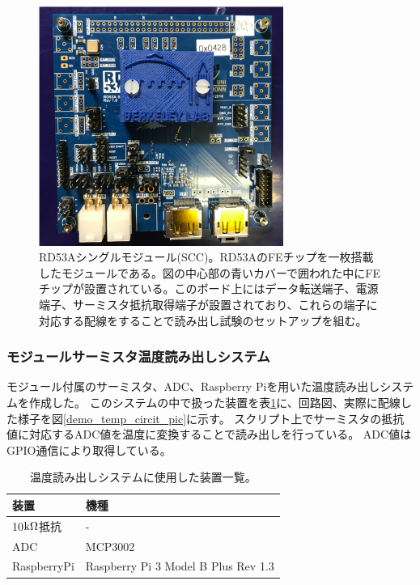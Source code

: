 \begin{figure}[h]\centering
\includegraphics[width=8cm]{rd53a_SCC}
\caption[RD53Aシングルモジュール(SCC)]{RD53Aシングルモジュール(SCC)\cite{5-10}。RD53AのFEチップを一枚搭載したモジュールである。図の中心部の青いカバーで囲われた中にFEチップが設置されている。このボード上にはデータ転送端子、電源端子、サーミスタ抵抗取得端子が設置されており、これらの端子に対応する配線をすることで読み出し試験のセットアップを組む。}
\label{demo_rd53a_SCC}
\end{figure}

\subsubsection{モジュールサーミスタ温度読み出しシステム}
モジュール付属のサーミスタ、ADC、Raspberry Piを用いた温度読み出しシステムを作成した。
このシステムの中で扱った装置を表\ref{demo_temp_device}に、回路図、実際に配線した様子を図\ref{demo_temp_circit_pic}に示す。
スクリプト上でサーミスタの抵抗値に対応するADC値を温度に変換することで読み出しを行っている。
ADC値はGPIO通信\cite{5-9}により取得している。

\begin{table}[tbp]
\begin{center}
\caption[温度読み出しシステムに使用した装置一覧]{温度読み出しシステムに使用した装置一覧。}
\label{demo_temp_device}
  \begin{tabular}{|ll|} \hline
    装置 & 機種 \\ \hline
    10$\rm{k\Omega}$抵抗 & - \\
    ADC & MCP3002\cite{5-3} \\  
    RaspberryPi &  Raspberry Pi 3 Model B Plus Rev 1.3\cite{5-4} \\ \hline 
  \end{tabular}
\end{center}
\end{table}

